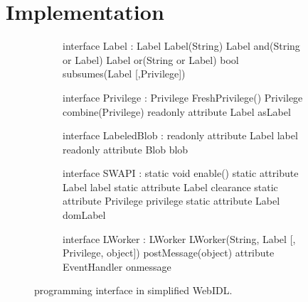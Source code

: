 \section{Implementation}
\label{sec:implementation}

\begin{figure}[t]
  \begin{subfigure}{\columnwidth}
    {\small
    \begin{webidl}
interface Label :
  Label Label(String)
  Label and(String or Label)
  Label or(String or Label)
  bool subsumes(Label [,Privilege])
    \end{webidl}
    \begin{webidl}
interface Privilege :
  Privilege FreshPrivilege()
  Privilege combine(Privilege)
  readonly attribute Label asLabel
    \end{webidl}
    }
    \vspace*{-8pt}
    \label{fig:api:policy} 
    \vspace*{8pt}
  \end{subfigure}
  \begin{subfigure}{\columnwidth}
    {\small
    \begin{webidl}
interface LabeledBlob :
  readonly attribute Label label
  readonly attribute Blob blob
    \end{webidl}
    }
    \vspace*{-8pt}
    \label{fig:api:blob} 
    \vspace*{8pt}
  \end{subfigure}
  \begin{subfigure}{\columnwidth}
    {\small
    \begin{webidl}
interface SWAPI :
  static void enable()
  static attribute Label label
  static attribute Label clearance 
  static attribute Privilege privilege
  static attribute Label domLabel
    \end{webidl}
    \begin{webidl}
interface LWorker :
  LWorker LWorker(String, Label
                  [, Privilege, object])
  postMessage(object)
  attribute EventHandler onmessage
    \end{webidl}
    }
    \vspace*{-8pt}
    \label{fig:api:compartments}
  \end{subfigure}
  \caption{ \sys{} programming interface in simplified WebIDL.}
  \label{fig:api}
\end{figure}

